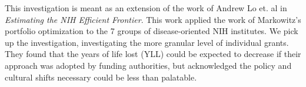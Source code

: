 This investigation is meant as an extension of the work of Andrew Lo et. al in \textit{Estimating the NIH Efficient Frontier}\cite{lo_2012}. This work applied the work of Markowitz's portfolio optimization \cite{markowitz} to the 7 groups of disease-oriented NIH institutes. We pick up the investigation, investigating the more granular level of individual grants. They found that the years of life lost (YLL) could be expected to decrease if their approach was adopted by funding authorities, but acknowledged the policy and cultural shifts necessary could be less than palatable. 